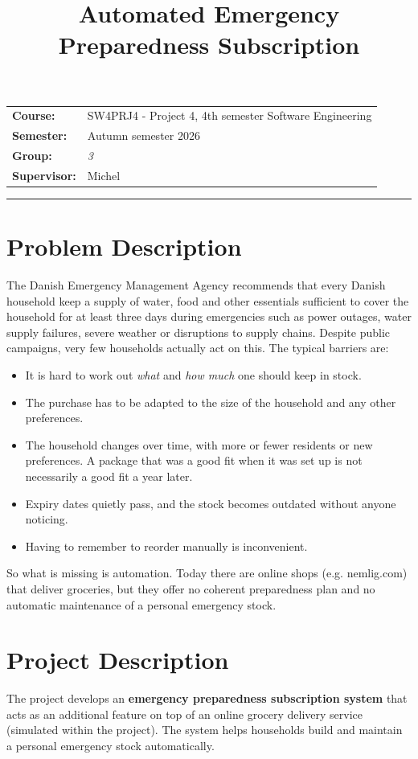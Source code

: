 \documentclass[11pt,a4paper]{article}
\title{\textbf{Automated Emergency Preparedness Subscription}}
\author{}
\date{}
\begin{document}
\maketitle
\vspace{-2\baselineskip}
\begin{center}
\begin{tabular}{@{}ll@{}}
\textbf{Course:}     & SW4PRJ4 - Project 4, 4th semester Software Engineering \\
\textbf{Semester:}   & Autumn semester 2026 \\
\textbf{Group:}      & \textit{3} \\
\textbf{Supervisor:} & Michel \\
\end{tabular}
\end{center}
\hrule
\vspace{1\baselineskip}
\section*{Problem Description}
The Danish Emergency Management Agency recommends that every Danish household keep a
supply of water, food and other essentials sufficient to cover the household for at
least three days during emergencies such as power outages, water supply failures,
severe weather or disruptions to supply chains. Despite public campaigns, very few
households actually act on this. The typical barriers are:
\begin{itemize}[nosep]
  \item It is hard to work out \emph{what} and \emph{how much} one should keep in stock.
  \item The purchase has to be adapted to the size of the household and any other preferences.
  \item The household changes over time, with more or fewer residents or new preferences. A package that was a good fit when it was set up is not necessarily a good fit a year later.
  \item Expiry dates quietly pass, and the stock becomes outdated without anyone noticing.
  \item Having to remember to reorder manually is inconvenient.
\end{itemize}
So what is missing is automation. Today
there are online shops (e.g. nemlig.com) that deliver groceries, but they offer no
coherent preparedness plan and no automatic maintenance of a personal emergency stock.
\section*{Project Description}
The project develops an \textbf{emergency preparedness subscription system} that acts as
an additional feature on top of an online grocery delivery service (simulated within the project). The system helps
households build and maintain a personal emergency stock automatically.
\end{document}
